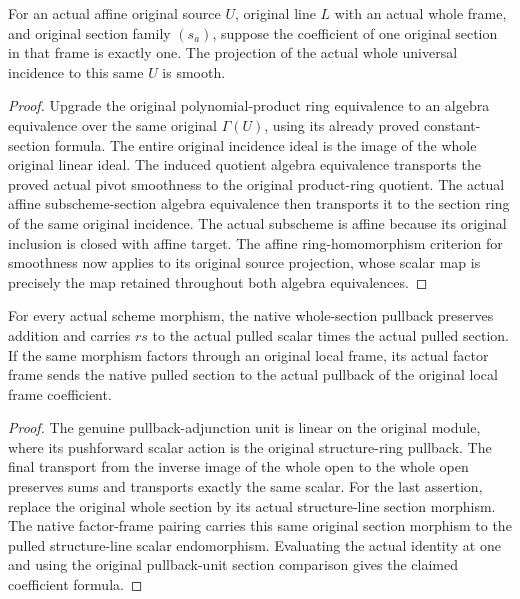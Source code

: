 \begin{lemma}
\label{lem:kn-nadel-bertini-affine-incidence-smooth}
\leanok
{}
For an actual affine original source $U$, original line $L$ with an actual
whole frame, and original section family $(s_a)$, suppose the coefficient
of one original section in that frame is exactly one. The projection of
the actual whole universal incidence to this same $U$ is smooth.
\end{lemma}
\begin{proof}
Upgrade the original polynomial-product ring equivalence to an algebra
equivalence over the same original $\Gamma(U)$, using its already proved
constant-section formula. The entire original incidence ideal is the image
of the whole original linear ideal. The induced quotient algebra
equivalence transports the proved actual pivot smoothness to the original
product-ring quotient. The actual affine subscheme-section algebra
equivalence then transports it to the section ring of the same original
incidence. The actual subscheme is affine because its original inclusion
is closed with affine target. The affine ring-homomorphism criterion for
smoothness now applies to its original source projection, whose scalar
map is precisely the map retained throughout both algebra equivalences.
\end{proof}

\begin{lemma}
\label{lem:kn-nadel-bertini-pullback-sections}
\leanok
{}
For every actual scheme morphism, the native whole-section pullback
preserves addition and carries $r s$ to the actual pulled scalar times the
actual pulled section. If the same morphism factors through an original
local frame, its actual factor frame sends the native pulled section to
the actual pullback of the original local frame coefficient.
\end{lemma}
\begin{proof}
The genuine pullback-adjunction unit is linear on the original module,
where its pushforward scalar action is the original structure-ring
pullback. The final transport from the inverse image of the whole open to
the whole open preserves sums and transports exactly the same scalar.
For the last assertion, replace the original whole section by its actual
structure-line section morphism. The native factor-frame pairing carries
this same original section morphism to the pulled structure-line scalar
endomorphism. Evaluating the actual identity at one and using the original
pullback-unit section comparison gives the claimed coefficient formula.
\end{proof}

